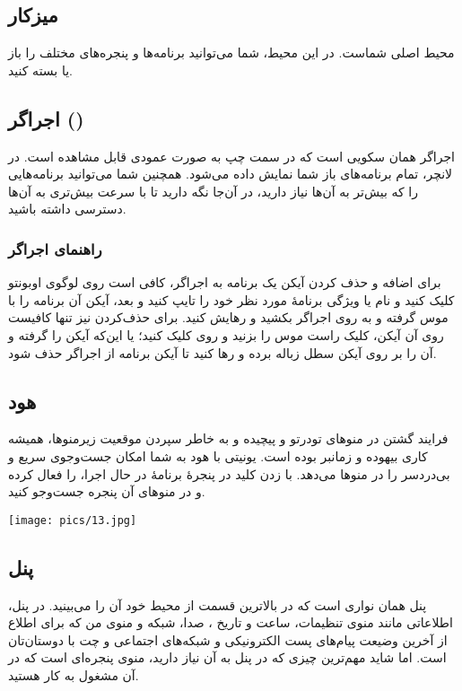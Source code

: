 \subsection{میزکار}
محیط اصلی شماست. در این محیط، شما می‌توانید برنامه‌ها و پنجره‌های مختلف را باز یا بسته کنید.
\subsection[اجراگر (Launcher)]{اجراگر ()}
اجراگر همان سکویی است که در سمت چپ به صورت عمودی قابل مشاهده است. در لانچر، تمام برنامه‌های باز شما نمایش داده می‌شود. همچنین شما می‌توانید برنامه‌هایی را که بیش‌تر به آن‌ها نیاز دارید، در آن‌جا نگه دارید تا با سرعت بیش‌تری به آن‌ها دسترسی داشته باشید.
\subsubsection{راهنمای اجراگر}
برای اضافه و حذف کردن آیکن یک برنامه به اجراگر، کافی است روی لوگوی اوبونتو کلیک کنید و نام یا ویژگی برنامهٔ مورد نظر خود را تایپ کنید و بعد، آیکن آن برنامه را با موس گرفته و به روی اجراگر بکشید و رهایش کنید. برای حذف‌کردن نیز تنها کافیست روی آن آیکن، کلیک راست موس را بزنید و روی  کلیک کنید؛ یا این‌که آیکن را گرفته و آن را بر روی آیکن سطل زباله برده و رها کنید تا آیکن برنامه از اجراگر حذف شود.
\subsection{هود}
فرایند گشتن در منوهای تودرتو و پیچیده و به خاطر سپردن موقعیت زیرمنوها، همیشه کاری بیهوده و زمانبر بوده است. یونیتی با هود به شما امکان جست‌و‌جوی سریع و بی‌دردسر را در منوها می‌دهد. با زدن کلید  در پنجرهٔ برنامهٔ در حال اجرا،  را فعال کرده و در منوهای آن پنجره جست‌وجو کنید.
\begin{center}
\texttt{[image: pics/13.jpg]}
\end{center}

\subsection{پنل}
پنل همان نواری است که در بالاترین قسمت از محیط خود آن را می‌بینید. در پنل، اطلاعاتی مانند منوی تنظیمات، ساعت و تاریخ ، صدا، شبکه و منوی من که برای اطلاع از آخرین وضیعت پیام‌های پست الکترونیکی و شبکه‌های اجتماعی و چت با دوستان‌تان است. اما شاید مهم‌ترین چیزی که در پنل به آن نیاز دارید، منوی پنجره‌ای است که در آن مشغول به کار هستید.

